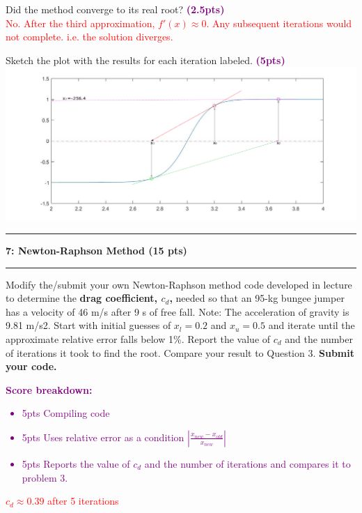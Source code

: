 \documentclass[11pt]{article}
\newcommand\question[2]{\vspace{.25in}\hrule\textbf{#1: #2}\vspace{.5em}\hrule\vspace{.10in}}
\begin{document}
Did the method converge to its real root? \textbf{\textcolor{purple}{(2.5pts)}}\\\vspace{0.4cm}
\textcolor{red}{No. After the third approximation, $f'(x) \approx 0$. Any subsequent iterations would not complete. i.e. the solution diverges.} 

Sketch the plot with the results for each iteration labeled. \textbf{\textcolor{purple}{(5pts)}}
\includegraphics[width = \textwidth]{problem6Plot}


\question{7}{Newton-Raphson Method (15 pts)}
Modify the/submit your own Newton-Raphson method code developed in lecture to determine the \textbf{drag coefficient, $c_d$,} needed
so that an 95-kg bungee jumper has a velocity of 46 m/s after
9 s of free fall. Note: The acceleration of gravity is 9.81 m/s2.
Start with initial guesses of $x_l = 0.2$ and $x_u = 0.5$ and iterate
until the approximate relative error falls below 1\%. Report the value of $c_d$ and the number of iterations it took to find the root. Compare your result to Question 3. \textbf{Submit your code.} \\

\textcolor{purple}{\textbf{Score breakdown:}
	\begin{itemize}
		\item 5pts Compiling code
		\item 5pts Uses relative error as a condition $|\frac{x_{new}-x_{old}}{x_{new}}|$
		\item 5pts Reports the value of $c_d$ and the number of iterations and compares it to problem 3.
\end{itemize}}
\textcolor{red}{$c_d \approx 0.39$ after 5 iterations}
\end{document}
